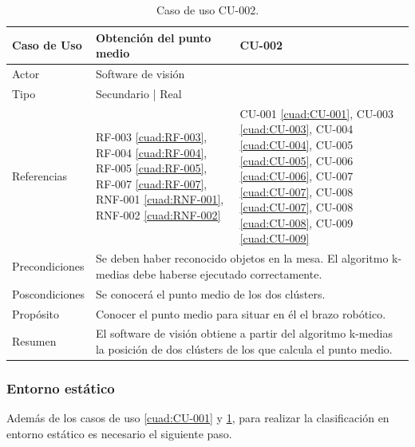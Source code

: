 \begin{table}[H]
	\centering
	\begin{tabular}{|p{2.5cm} | p{6cm} | p{5cm} |}
		\hline
		\textbf{Caso de Uso} & Obtención del punto medio & \textbf{CU-002} \\
		\hline 
		Actor & \multicolumn{2}{|l|}{Software de visión} \\
		\hline
		Tipo & \multicolumn{2}{|l|}{Secundario | Real} \\
		\hline
		Referencias & RF-003 \ref{cuad:RF-003}, RF-004 \ref{cuad:RF-004}, RF-005 \ref{cuad:RF-005}, RF-007 \ref{cuad:RF-007}, RNF-001 \ref{cuad:RNF-001}, RNF-002 \ref{cuad:RNF-002} & CU-001 \ref{cuad:CU-001}, CU-003 \ref{cuad:CU-003}, CU-004 \ref{cuad:CU-004}, CU-005 \ref{cuad:CU-005}, CU-006 \ref{cuad:CU-006}, CU-007 \ref{cuad:CU-007}, CU-008 \ref{cuad:CU-007}, CU-008 \ref{cuad:CU-008}, CU-009 \ref{cuad:CU-009} \\
		\hline
		Precondiciones & \multicolumn{2}{|l|}{\parbox{30em}{Se deben haber reconocido objetos en la mesa. El algoritmo k-medias debe haberse ejecutado correctamente.}} \\
		\hline
		Poscondiciones & \multicolumn{2}{|l|}{Se conocerá el punto medio de los dos clústers.}\\
		\hline
		Propósito & \multicolumn{2}{|l|}{Conocer el punto medio para situar en él el brazo robótico.} \\
		\hline
		Resumen & \multicolumn{2}{|l|}{\parbox{30em}{El software de visión obtiene a partir del algoritmo k-medias la posición de dos clústers de los que calcula el punto medio.}} \\
		\hline
		
	\end{tabular}
	\caption{Caso de uso CU-002.}
	\label{cuad:CU-002}
\end{table}

\subsubsection{Entorno estático}

\noindent Además de los casos de uso \ref{cuad:CU-001} y \ref{cuad:CU-002}, para realizar la clasificación en entorno estático es necesario el siguiente paso. \\

